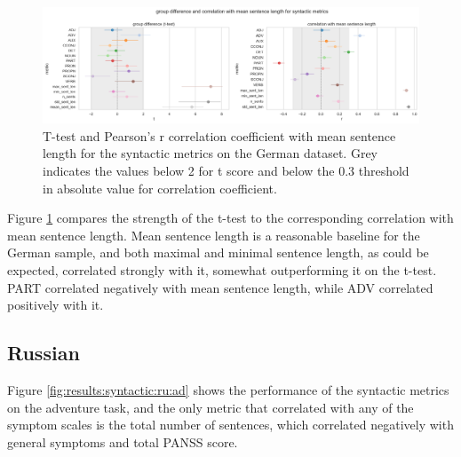 \clearpage
\begin{figure}[ht!]
    \includegraphics[width=1.1\textwidth, center]{Figures/chapter_4/syntactic/de_t_test_corr_len.png} 
\captionsetup{width=\textwidth}
\caption[Syntactic Metrics: German (T-Test)]{\label{fig:results:syntactic:de:ttest} T-test and Pearson's r correlation coefficient with mean sentence length for the syntactic metrics on the German dataset. Grey indicates the values below 2 for t score and below the 0.3 threshold in absolute value for correlation coefficient.}
\end{figure}


Figure \ref{fig:results:syntactic:de:ttest} compares the strength of the t-test to the corresponding correlation with mean sentence length. Mean sentence length is a reasonable baseline for the German sample, and both maximal and minimal sentence length, as could be expected, correlated strongly with it, somewhat outperforming it on the t-test. PART correlated negatively with mean sentence length, while ADV correlated positively with it.

\clearpage
\subsection{Russian}

Figure \ref{fig:results:syntactic:ru:ad} shows the performance of the syntactic metrics on the adventure task, and the only metric that correlated with any of the symptom scales is the total number of sentences, which correlated negatively with general symptoms and total PANSS score.

